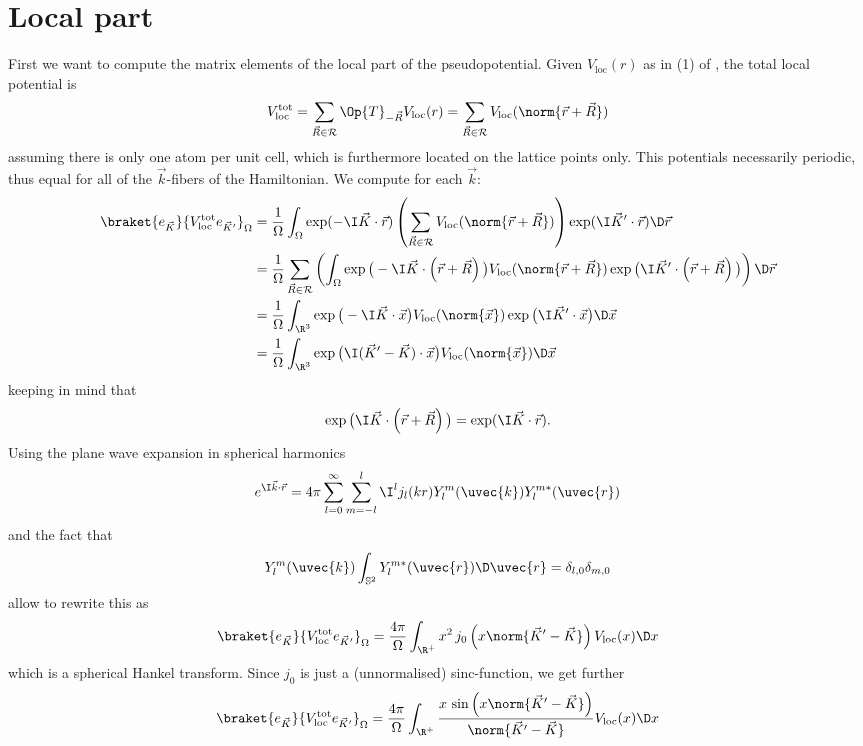 \documentclass{MFHarticle}
\begin{document}
\section{Local part}
First we want to compute the matrix elements of the local part
of the pseudopotential.
Given $V_\text{loc}(r)$ as in (1) of \citet{Goedecker1996},
the total local potential is
\[ V_\text{loc}^\text{tot}
= \sum_{\vec{R}\in \mathcal{R}} \Op{T}_{-\vec{R}} V_\text{loc}(r)
= \sum_{\vec{R}\in \mathcal{R}} V_\text{loc}(\norm{\vec{r} + \vec{R}}) \]
assuming there is only one atom per unit cell, which is furthermore
located on the lattice points only.
This potentials necessarily periodic,
thus equal for all of the $\vec{k}$-fibers of the Hamiltonian.
We compute for each $\vec{k}$:
\begin{align*}
	\braket{e_{\vec{K}}}{V_\text{loc}^\text{tot} e_{\vec{K}'}}_\Omega
	&= \frac1{\Omega} \int_\Omega \exp(-\I \vec{K} \cdot \vec{r})
	\left(\sum_{\vec{R}\in \mathcal{R}}
	V_\text{loc}(\norm{\vec{r} + \vec{R}})\right)
	\exp(\I \vec{K}' \cdot \vec{r}) \D\vec{r} \\
	&= \frac1{\Omega} \sum_{\vec{R}\in \mathcal{R}} \left(\int_\Omega
	\exp\big(-\I \vec{K} \cdot \left(\vec{r} + \vec{R}\right) \big)
	V_\text{loc}(\norm{\vec{r} + \vec{R}})
	\exp\big(\I \vec{K}' \cdot \left(\vec{r} + \vec{R} \right)\big) \right)
	\D\vec{r} \\
	&= \frac1{\Omega} \int_{\R^3} \exp\big(-\I \vec{K} \cdot\vec{x}\big)
	V_\text{loc}(\norm{\vec{x}}) \exp\big(\I \vec{K}' \cdot \vec{x}\big) \D\vec{x} \\
	&= \frac1{\Omega} \int_{\R^3} \exp\big(\I (\vec{K}'-\vec{K}) \cdot\vec{x}\big)
	V_\text{loc}(\norm{\vec{x}}) \D\vec{x}
\end{align*}
keeping in mind that
\[ \exp\big(\I \vec{K} \cdot \left(\vec{r} + \vec{R}\right)\big) = \exp(\I \vec{K} \cdot \vec{r}). \]
Using the plane wave expansion in spherical harmonics
\[
	e^{\I \vec{k} \cdot \vec{r}} =
	4 \pi \sum_{l = 0}^\infty \sum_{m = -l}^l
	\I^l j_l(k r) Y_l^m(\uvec{k}) Y_l^{m\ast}(\uvec{r})
\]
and the fact that
\[
	Y_l^m(\uvec{k}) \int_{\mathbb{S}^2} Y_l^{m\ast}(\uvec{r}) \D \uvec{r}
		= \delta_{l,0} \delta_{m,0}
\]
allow to rewrite this as
\[
	\braket{e_{\vec{K}}}{V_\text{loc}^\text{tot} e_{\vec{K}'}}_\Omega
	= \frac{4\pi}{\Omega} \int_{\R^+}
	x^2\,  j_0\left(x \norm{\vec{K}'-\vec{K}}\right)
	V_\text{loc}(x) \D x
\]
which is a spherical Hankel transform.
Since $j_0$ is just a (unnormalised)
sinc-function, we get further
\begin{equation}
	\braket{e_{\vec{K}}}{V_\text{loc}^\text{tot} e_{\vec{K}'}}_\Omega
	= \frac{4\pi}{\Omega} \int_{\R^+}
	\frac{x\, \sin\left(x\norm{\vec{K}'-\vec{K}}\right)}
	{\norm{\vec{K}'-\vec{K}}}
	V_\text{loc}(x) \D x
	\label{eqn:Local}
\end{equation}
\end{document}
